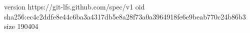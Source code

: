 version https://git-lfs.github.com/spec/v1
oid sha256:ec4c2ddfe8e44c6ba3a4317db5e8a28f73a0a3964918fe6e9beab770c24b86b3
size 190404
